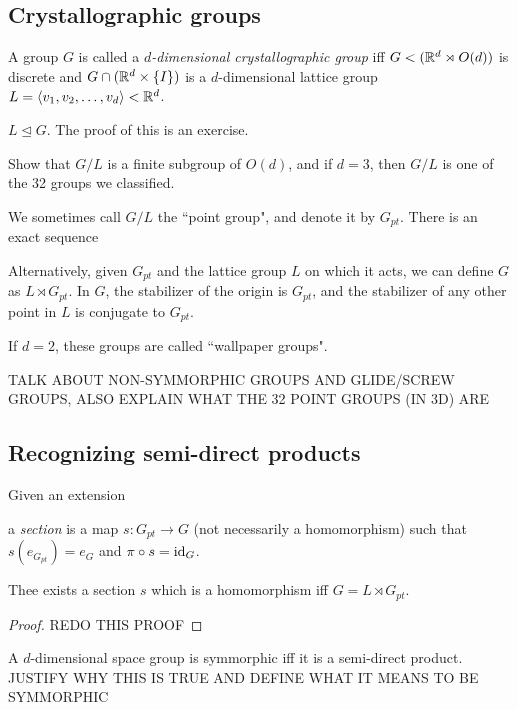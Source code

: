 \documentclass[class=article, crop=false]{standalone}
\begin{document}
\subsection{Crystallographic groups}
A group $G$ is called a \emph{$d$-dimensional crystallographic group} iff $G <( \mathbb{R}^d \rtimes O(d))$ is discrete and $G \cap ( \mathbb{R}^d \times \left\{ I \right\})$ is a $d$-dimensional lattice group $L = \left\langle v_1, v_2, \dots, v_d \right\rangle < \mathbb{R}^d$.
\begin{prop}
    $L \trianglelefteq G$. The proof of this is an exercise.
\end{prop}
\begin{prob}
    Show that $G/L$ is a finite subgroup of $O(d)$, and if $d=3$, then $G/L$ is one of the 32 groups we classified.
\end{prob}
We sometimes call $G/L$ the ``point group", and denote it by $G_{pt}$. There is an exact sequence
\begin{center}
\end{center}
Alternatively, given $G_{pt}$ and the lattice group $L$ on which it acts, we can define $G$ as $L \rtimes G_{pt}$. In $G$, the stabilizer of the origin is $G_{pt}$, and the stabilizer of any other point in $L$ is conjugate to $G_{pt}$.
\par
If $d=2$, these groups are called ``wallpaper groups".
\par
TALK ABOUT NON-SYMMORPHIC GROUPS AND GLIDE/SCREW GROUPS, ALSO EXPLAIN WHAT THE 32 POINT GROUPS (IN 3D) ARE

\subsection{Recognizing semi-direct products}
Given an extension
\begin{center}
\end{center}
a \emph{section} is a map $s: G_{pt} \rightarrow G$ (not necessarily a homomorphism) such that $s(e_{G_{pt}}) = e_G$ and $\pi \circ s = \operatorname{id}_G$.
\begin{thm}
    Thee exists a section $s$ which is a homomorphism iff $G = L \rtimes G_{pt}$.
\end{thm}
\begin{proof}
    REDO THIS PROOF
\end{proof}
\begin{prop}
    A $d$-dimensional space group is symmorphic iff it is a semi-direct product. JUSTIFY WHY THIS IS TRUE AND DEFINE WHAT IT MEANS TO BE SYMMORPHIC
\end{prop}
\end{document}
